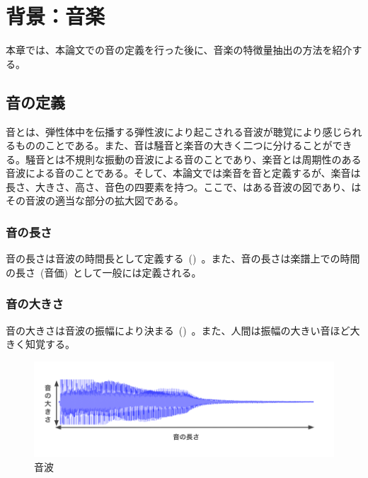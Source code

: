\chapter{背景：音楽}

本章では、本論文での音の定義を行った後に、音楽の特徴量抽出の方法を紹介する。

\section{音の定義}

音とは、弾性体中を伝播する弾性波により起こされる音波が聴覚により感じられるもののことである。また、音は騒音と楽音の大きく二つに分けることができる。騒音とは不規則な振動の音波による音のことであり、楽音とは周期性のある音波による音のことである。そして、本論文では楽音を音と定義するが、楽音は長さ、大きさ、高さ、音色の四要素を持つ。ここで、はある音波の図であり、はその音波の適当な部分の拡大図である。

\subsection{音の長さ}

音の長さは音波の時間長として定義する~()~。また、音の長さは楽譜上での時間の長さ~(音価)~として一般には定義される。

\subsection{音の大きさ}

音の大きさは音波の振幅により決まる~()~。また、人間は振幅の大きい音ほど大きく知覚する。

\begin{figure}[b]
\centering
\includegraphics[width=\hsize]{figure/gakuon1.png}
\caption{音波}
\label{fig:gakuon1}
\end{figure}

